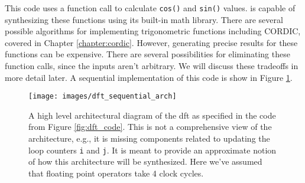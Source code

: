 This code uses a function call to calculate \lstinline|cos()| and \lstinline|sin()| values. \VHLS is capable of synthesizing these functions using its built-in math library. There are several possible algorithms \cite{detrey07hotbm} for implementing trigonometric functions including CORDIC, covered in Chapter \ref{chapter:cordic}.  However, generating precise results for these functions can be expensive.  There are several possibilities for eliminating these function calls, since the inputs aren't arbitrary.  We will discuss these tradeoffs in more detail later.    A sequential implementation of this code is show in Figure \ref{fig:dft_sequential_arch}. 


\begin{figure}
\centering
\begin{tiny}

\end{tiny}
\end{figure}

\begin{figure}
\centering
\texttt{[image: images/dft\_sequential\_arch]}
\caption{ A high level architectural diagram of the \gls{dft} as specified in the code from Figure \ref{fig:dft_code}. This is not a comprehensive view of the architecture, e.g., it is missing components related to updating the loop counters \lstinline|i| and \lstinline|j|. It is meant to provide an approximate notion of how this architecture will be synthesized.  Here we've assumed that floating point operators take 4 clock cycles.}
\label{fig:dft_sequential_arch}
\end{figure}

